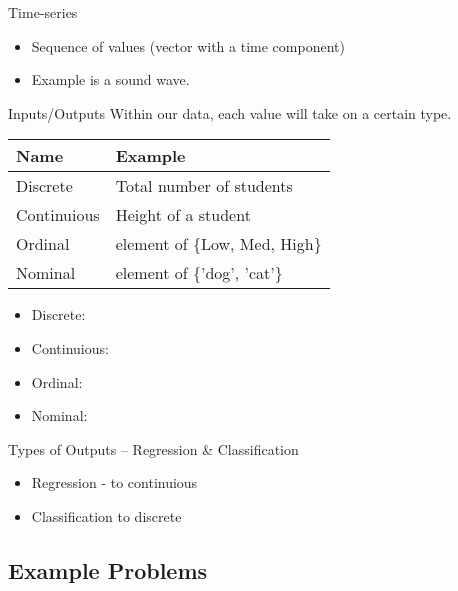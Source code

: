 \documentclass[10pt]{beamer}
\begin{document}
\begin{frame}[label={sec:org74c65a6}]{Time-series}
\begin{itemize}
\item Sequence of values (vector with a time component)
\item Example is a sound wave.
\end{itemize}
\end{frame}

\begin{frame}[label={sec:orgb409b41}]{Inputs/Outputs}
Within our data, each value will take on a certain type.

\begin{center}
\begin{tabular}{ll}
Name & Example\\
\hline
Discrete & Total number of students\\
Continuious & Height of a student\\
\hline
Ordinal & element of \{Low, Med, High\}\\
Nominal & element of \{'dog', 'cat'\}\\
\end{tabular}
\end{center}

\begin{itemize}
\item Discrete:
\item Continuious:
\item Ordinal:
\item Nominal:
\end{itemize}
\end{frame}

\begin{frame}[label={sec:org4ed8c6c}]{Types of Outputs -- Regression \& Classification}
\begin{itemize}
\item Regression - to continuious
\item Classification to discrete
\end{itemize}
\end{frame}

\subsection*{Example Problems}
\label{sec:org4ff2f18}
\end{document}
